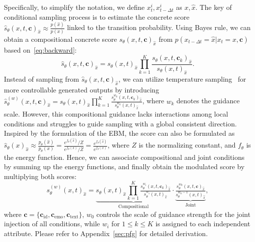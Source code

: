 Specifically, to simplify the notation, we define $x^i_t,x^i_{t-\Delta t}$ as $x,\hat{x}$. The key of conditional sampling process is to estimate the concrete score $ \hat{s}_\theta\left({x},t,\bm{c}\right)_{\hat{x}} \approx \frac{ p(\hat{x})}{p(x)}$ linked to the transition probability. 
Using Bayes rule, we can obtain a compositional concrete score $\hat{s}_\theta\left(x,t,\bm{c}\right)_{\hat{x}}$ from $p (x_{t- \Delta t} = \hat{x} | x_{t}=x, \bm{c} )$ based on~\cref{eq:backward}: 
\begin{equation}
\label{eq:cond_score}
\hat{s}_\theta\left(x,t,\bm{c}\right)_{\hat{x}} = s_\theta(x,t)_{\hat{x}}\prod\limits_{k=1}^{K}\frac{s_\theta(x,t,\bm{c}_k)_{\hat{x}}}{s_\theta(x,t)_{\hat{x}}}. 
\end{equation}
Instead of sampling from $\hat{s}_\theta\left(x,t,\bm{c}\right)_{\hat{x}}$, we can utilize temperature sampling~\cite{temperature:conf/nips/KingmaD18,temperature:conf/interspeech/MehtaKLBSH23} for more controllable generated outputs by introducing $\hat{s}^{(w)}_\theta\left(x,t,\bm{c}\right)_{\hat{x}}=s_\theta(x,t)_{\hat{x}}\prod_{k=1}^{K}\frac{s^{w_k}_\theta(x,t,\bm{c}_k)_{\hat{x}}}{s^{w_k}_\theta(x,t)_{\hat{x}}}$, where $w_k$ denotes the guidance scale. However, this compositional guidance lacks interactions among local conditions and struggles to guide sampling with a global consistent direction. Inspired by the formulation of the EBM, the score can also be formulated as $\hat{s}_\theta(x)_{\hat{x}}\approx \frac{p_{\theta} ( \hat{x} )} {p_{\theta} ( x )}=\frac{e^{f_{\theta} ( \hat{x} )} / Z} {e^{f_{\theta} ( x )} / Z}=\frac{e^{f_{\theta} ( \hat{x} )}} {e^{f_{\theta} ( x )}}$, where $Z$ is the normalizing constant, and $f_\theta$ is the energy function. 
Hence, we can associate compositional and joint conditions by summing up the energy functions, and finally obtain the modulated score by multiplying both scores:
\begin{equation}
\label{eq:pfg}
    \hat{s}^{(w)}_\theta\left({x},t\right)_{\hat{x}} \!=\!   \underbrace{s_\theta({x},t)_{\hat{x}}\prod\limits_{k=1}^{K} \tfrac{s^{w_i} _\theta({x},t,\bm{c}_k)_{\hat{x}}}{s^{w_i} _\theta({x},t)_{\hat{x}}}}_\text{Compositional} \cdot \underbrace{\tfrac{s^{w_0} _\theta({x},t,\bm{c})_{\hat{x}}}{s^{w_0-1} _\theta({x},t)_{\hat{x}}}}_\text{Joint},
\end{equation}
where $\bm{c}=\{\bm{c}_\text{id},\bm{c}_\text{emo},\bm{c}_\text{text}\}$, $w_0$ controls the scale of guidance strength for the joint injection of all conditions, while $w_i$ for $1\leq k \leq K$ is assigned to each independent attribute. Please refer to Appendix~\ref{sec:pfg} for detailed derivation.
 

